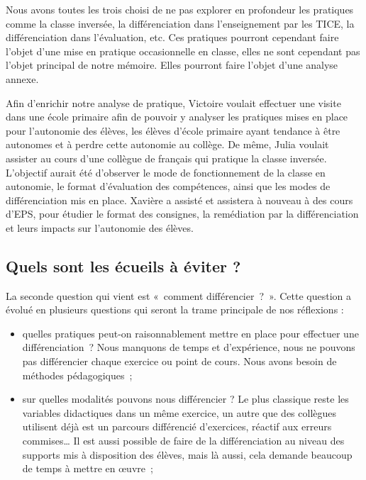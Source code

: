 Nous avons toutes les trois choisi de ne pas explorer en profondeur les pratiques comme la classe inversée, la différenciation dans l’enseignement par les TICE, la différenciation dans l’évaluation, etc. Ces pratiques pourront cependant faire l’objet d’une mise en pratique occasionnelle en classe, elles ne sont cependant pas l’objet principal de notre mémoire. Elles pourront faire l’objet d’une analyse annexe.

Afin d’enrichir notre analyse de pratique, Victoire voulait effectuer une visite dans une école primaire afin de pouvoir y analyser les pratiques mises en place pour l’autonomie des élèves, les élèves d’école primaire ayant tendance à être autonomes et à perdre cette autonomie au collège. De même, Julia voulait assister au cours d’une collègue de français qui pratique la classe inversée. L’objectif aurait été d’observer le mode de fonctionnement de la classe en autonomie, le format d’évaluation des compétences, ainsi que les modes de différenciation mis en place. Xavière a assisté et assistera à nouveau à des cours d’EPS, pour étudier le format des consignes, la remédiation par la différenciation et leurs impacts sur l’autonomie des élèves.

\subsection{Quels sont les écueils à éviter ?}


La seconde question qui vient est « comment différencier ? ». Cette question a évolué en plusieurs questions qui seront la trame principale de nos réflexions :
\begin{itemize}
    \item quelles pratiques peut-on raisonnablement mettre en place pour effectuer une différenciation ? Nous manquons de temps et d’expérience, nous ne pouvons pas différencier chaque exercice ou point de cours. Nous avons besoin de méthodes pédagogiques ;
    \item sur quelles modalités pouvons nous différencier ? Le plus classique reste les variables didactiques dans un même exercice, un autre que des collègues utilisent déjà est un parcours différencié d’exercices, réactif aux erreurs commises… Il est aussi possible de faire de la différenciation au niveau des supports mis à disposition des élèves, mais là aussi, cela demande beaucoup de temps à mettre en œuvre ;
\end{itemize}

